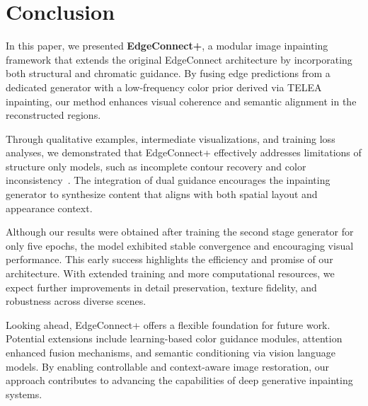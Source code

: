 \section{Conclusion}
\label{sec:conclusion}

In this paper, we presented \textbf{EdgeConnect+}, a modular image inpainting framework that extends the original EdgeConnect architecture by incorporating both structural and chromatic guidance. By fusing edge predictions from a dedicated generator with a low-frequency color prior derived via TELEA inpainting, our method enhances visual coherence and semantic alignment in the reconstructed regions.

Through qualitative examples, intermediate visualizations, and training loss analyses, we demonstrated that EdgeConnect+ effectively addresses limitations of structure only models, such as incomplete contour recovery and color inconsistency~\cite{nazeri2019edgeconnect, yu2019free, liu2021pd}. The integration of dual guidance encourages the inpainting generator to synthesize content that aligns with both spatial layout and appearance context.

Although our results were obtained after training the second stage generator for only five epochs, the model exhibited stable convergence and encouraging visual performance. This early success highlights the efficiency and promise of our architecture. With extended training and more computational resources, we expect further improvements in detail preservation, texture fidelity, and robustness across diverse scenes.

Looking ahead, EdgeConnect+ offers a flexible foundation for future work. Potential extensions include learning-based color guidance modules, attention enhanced fusion mechanisms, and semantic conditioning via vision language models. By enabling controllable and context-aware image restoration, our approach contributes to advancing the capabilities of deep generative inpainting systems.

